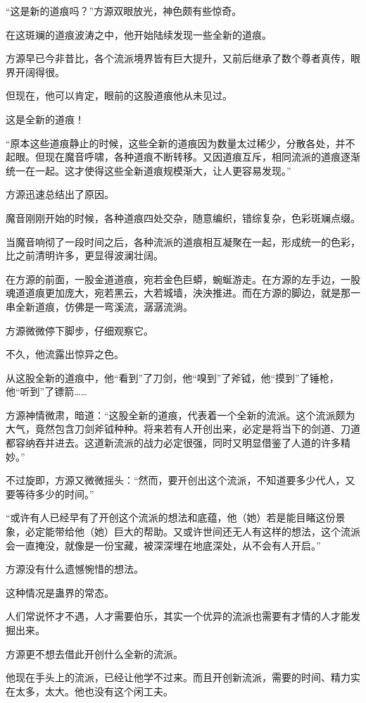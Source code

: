 \begin{this_body}
“这是新的道痕吗？”方源双眼放光，神色颇有些惊奇。

在这斑斓的道痕波涛之中，他开始陆续发现一些全新的道痕。

方源早已今非昔比，各个流派境界皆有巨大提升，又前后继承了数个尊者真传，眼界开阔得很。

但现在，他可以肯定，眼前的这股道痕他从未见过。

这是全新的道痕！

“原本这些道痕静止的时候，这些全新的道痕因为数量太过稀少，分散各处，并不起眼。但现在魔音呼啸，各种道痕不断转移。又因道痕互斥，相同流派的道痕逐渐统一在一起。这才使得这些全新道痕规模渐大，让人更容易发现。”

方源迅速总结出了原因。

魔音刚刚开始的时候，各种道痕四处交杂，随意编织，错综复杂，色彩斑斓点缀。

当魔音响彻了一段时间之后，各种流派的道痕相互凝聚在一起，形成统一的色彩，比之前清明许多，更显得波澜壮阔。

在方源的前面，一股金道道痕，宛若金色巨蟒，蜿蜒游走。在方源的左手边，一股魂道道痕更加庞大，宛若黑云，大若城墙，泱泱推进。而在方源的脚边，就是那一串全新道痕，仿佛是一弯溪流，潺潺流淌。

方源微微停下脚步，仔细观察它。

不久，他流露出惊异之色。

从这股全新的道痕中，他“看到”了刀剑，他“嗅到”了斧钺，他“摸到”了锤枪，他“听到”了镖箭……

方源神情微肃，暗道：“这股全新的道痕，代表着一个全新的流派。这个流派颇为大气，竟然包含刀剑斧钺种种。将来若有人开创出来，必定是将当下的剑道、刀道都容纳吞并进去。这道新流派的战力必定很强，同时又明显借鉴了人道的许多精妙。”

不过旋即，方源又微微摇头：“然而，要开创出这个流派，不知道要多少代人，又要等待多少的时间。”

“或许有人已经早有了开创这个流派的想法和底蕴，他（她）若是能目睹这份景象，必定能带给他（她）巨大的帮助。又或许世间还无人有这样的想法，这个流派会一直掩没，就像是一份宝藏，被深深埋在地底深处，从不会有人开启。”

方源没有什么遗憾惋惜的想法。

这种情况是蛊界的常态。

人们常说怀才不遇，人才需要伯乐，其实一个优异的流派也需要有才情的人才能发掘出来。

方源更不想去借此开创什么全新的流派。

他现在手头上的流派，已经让他学不过来。而且开创新流派，需要的时间、精力实在太多，太大。他也没有这个闲工夫。


\end{this_body}
